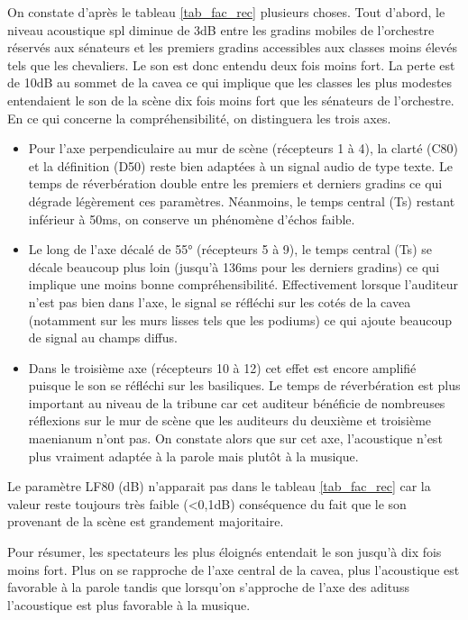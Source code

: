 On constate d'après le tableau \ref{tab_fac_rec} plusieurs choses. Tout d'abord, le niveau acoustique \gls{spl} diminue de 3dB entre les gradins mobiles de l'orchestre réservés aux sénateurs et les premiers gradins accessibles aux classes moins élevés tels que les chevaliers. Le son est donc entendu deux fois moins fort. La perte est de 10dB au sommet de la cavea ce qui implique que les classes les plus modestes entendaient le son de la scène dix fois moins fort que les sénateurs de l'orchestre. En ce qui concerne la compréhensibilité, on distinguera les trois axes.
\begin{itemize}
\item Pour l'axe perpendiculaire au mur de scène (récepteurs 1 à 4), la clarté (\gls{C80}) et la définition (\gls{D50}) reste bien adaptées à un signal audio de type texte. Le temps de réverbération double entre les premiers et derniers gradins ce qui dégrade légèrement ces paramètres. Néanmoins, le temps central (\gls{Ts}) restant inférieur à 50ms, on conserve un phénomène d'échos faible.
\item Le long de l'axe décalé de 55° (récepteurs 5 à 9), le temps central (\gls{Ts}) se décale beaucoup plus loin (jusqu'à 136ms pour les derniers gradins) ce qui implique une moins bonne compréhensibilité. Effectivement lorsque l'auditeur n'est pas bien dans l'axe, le signal se réfléchi sur les cotés de la \gls{cavea} (notamment sur les murs lisses tels que les \glspl{podium}) ce qui ajoute beaucoup de signal au champs diffus.  
\item Dans le troisième axe (récepteurs 10 à 12) cet effet est encore amplifié puisque le son se réfléchi sur les \glspl{basilique}. Le temps de réverbération est plus important au niveau de la tribune car cet auditeur bénéficie de nombreuses réflexions sur le mur de scène que les auditeurs du deuxième et troisième \gls{maenianum} n'ont pas. On constate alors que sur cet axe, l'acoustique n'est plus vraiment adaptée à la parole mais plutôt à la musique.
\end{itemize}
Le paramètre \gls{LF80} (dB) n'apparait pas dans le tableau \ref{tab_fac_rec} car la valeur reste toujours très faible (<0,1dB) conséquence du fait que le son provenant de la scène est grandement majoritaire.

Pour résumer, les spectateurs les plus éloignés entendait le son jusqu'à dix fois moins fort. Plus on se rapproche de l'axe central de la \gls{cavea}, plus l'acoustique est favorable à la parole tandis que lorsqu'on s'approche de l'axe des \glspl{aditus} l'acoustique est plus favorable à la musique.

